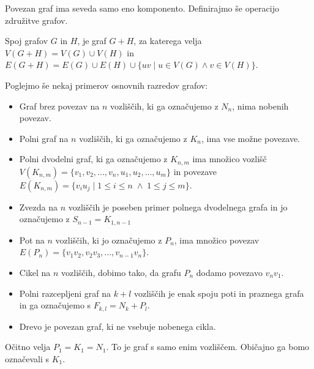 \documentclass[mat1, tisk]{fmfdelo}
\newcommand{\1}{(1, 1, ..., 1)}
\newcommand{\2}{(2, 2, ..., 2)}
\begin{document}
Povezan graf ima seveda samo eno komponento. Definirajmo še operacijo združitve grafov.

\begin{definicija} \label{def:vsota}
    Spoj grafov $G$ in $H$, je graf $G + H$, za katerega velja $V(G + H) = V(G) \cup V(H)$ 
    in $E(G + H)  = E(G) \cup E(H) \cup \{ uv \;  | \;  u \in V(G) \land v \in V(H) \}.$
\end{definicija}

Poglejmo še nekaj primerov osnovnih razredov grafov:
\begin{itemize} \label{primeri_grafov}
    \item Graf brez povezav na $n$ vozliščih, ki ga označujemo z $N_n$, nima nobenih povezav. 
    \item Polni graf na $n$ vozliščih, ki ga označujemo z $K_n$, ima vse možne povezave.
    \item Polni dvodelni graf, ki ga označujemo z $K_{n, m}$ ima množico 
    vozlišč $V(K_{n,m}) = \{ v_1, v_2, ... , v_n , u_1, u_2, ... , u_m \}$
    in povezave $E(K_{n, m}) = \{ v_i u_j \; | \;  1 \leq i \leq n \; \land \; 1 \leq j \leq m \}.$ 
    \item Zvezda na $n$ vozliščih je poseben primer polnega dvodelnega grafa in jo označujemo
    z $S_{n-1} = K_{1, n-1}$
    \item Pot na $n$ vozliščih, ki jo označujemo z $P_n$, ima množico povezav 
    $E(P_n) = \{ v_1 v_2 , v_2 v_3 , ... , v_{n-1} v_n\}.$
    \item Cikel na $n$ vozliščih, dobimo tako, da grafu $P_n$ dodamo povezavo $v_n v_1$.
    \item Polni razcepljeni graf na $k+l$ vozliščih je enak spoju poti in praznega grafa in ga 
    označujemo s $F_{k,l} = N_k + P_l.$
    \item Drevo je povezan graf, ki ne vsebuje nobenega cikla.
\end{itemize}

\begin{opomba}
    Očitno velja $P_1 = K_1 = N_1.$ To je graf s samo enim vozliščem. Običajno ga bomo
    označevali s $K_1.$
\end{opomba}


\end{document}
